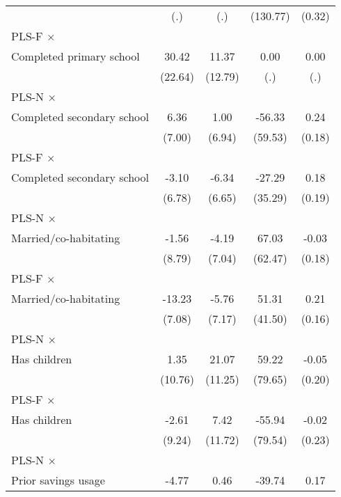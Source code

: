 \begin{table}[htbp]
\begin{tabular}{l*{4}{c}}
                &      (.)         &      (.)         & (130.77)         &   (0.32)         \\
\addlinespace
PLS-F $\times$ \\ Completed primary school&    30.42         &    11.37         &     0.00         &     0.00         \\
                &  (22.64)         &  (12.79)         &      (.)         &      (.)         \\
\addlinespace
PLS-N $\times$ \\ Completed secondary school&     6.36         &     1.00         &   -56.33         &     0.24         \\
                &   (7.00)         &   (6.94)         &  (59.53)         &   (0.18)         \\
\addlinespace
PLS-F $\times$ \\ Completed secondary school&    -3.10         &    -6.34         &   -27.29         &     0.18         \\
                &   (6.78)         &   (6.65)         &  (35.29)         &   (0.19)         \\
\addlinespace
PLS-N $\times$ \\ Married/co-habitating&    -1.56         &    -4.19         &    67.03         &    -0.03         \\
                &   (8.79)         &   (7.04)         &  (62.47)         &   (0.18)         \\
\addlinespace
PLS-F $\times$ \\ Married/co-habitating&   -13.23\sym{*}  &    -5.76         &    51.31         &     0.21         \\
                &   (7.08)         &   (7.17)         &  (41.50)         &   (0.16)         \\
\addlinespace
PLS-N $\times$ \\ Has children&     1.35         &    21.07\sym{*}  &    59.22         &    -0.05         \\
                &  (10.76)         &  (11.25)         &  (79.65)         &   (0.20)         \\
\addlinespace
PLS-F $\times$ \\ Has children&    -2.61         &     7.42         &   -55.94         &    -0.02         \\
                &   (9.24)         &  (11.72)         &  (79.54)         &   (0.23)         \\
\addlinespace
PLS-N $\times$ \\ Prior savings usage&    -4.77         &     0.46         &   -39.74         &     0.17         \\

\end{tabular}
\end{table}
